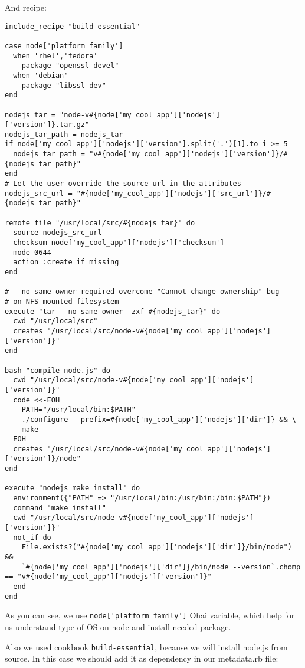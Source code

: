 And recipe:

\begin{lstlisting}[label=lst:cookbook-ohai-recipe-before,title=my-server-cloud/site-cookbooks/my\_cool\_app/recipes/node.rb]
include_recipe "build-essential"

case node['platform_family']
  when 'rhel','fedora'
    package "openssl-devel"
  when 'debian'
    package "libssl-dev"
end

nodejs_tar = "node-v#{node['my_cool_app']['nodejs']['version']}.tar.gz"
nodejs_tar_path = nodejs_tar
if node['my_cool_app']['nodejs']['version'].split('.')[1].to_i >= 5
  nodejs_tar_path = "v#{node['my_cool_app']['nodejs']['version']}/#{nodejs_tar_path}"
end
# Let the user override the source url in the attributes
nodejs_src_url = "#{node['my_cool_app']['nodejs']['src_url']}/#{nodejs_tar_path}"

remote_file "/usr/local/src/#{nodejs_tar}" do
  source nodejs_src_url
  checksum node['my_cool_app']['nodejs']['checksum']
  mode 0644
  action :create_if_missing
end

# --no-same-owner required overcome "Cannot change ownership" bug
# on NFS-mounted filesystem
execute "tar --no-same-owner -zxf #{nodejs_tar}" do
  cwd "/usr/local/src"
  creates "/usr/local/src/node-v#{node['my_cool_app']['nodejs']['version']}"
end

bash "compile node.js" do
  cwd "/usr/local/src/node-v#{node['my_cool_app']['nodejs']['version']}"
  code <<-EOH
    PATH="/usr/local/bin:$PATH"
    ./configure --prefix=#{node['my_cool_app']['nodejs']['dir']} && \
    make
  EOH
  creates "/usr/local/src/node-v#{node['my_cool_app']['nodejs']['version']}/node"
end

execute "nodejs make install" do
  environment({"PATH" => "/usr/local/bin:/usr/bin:/bin:$PATH"})
  command "make install"
  cwd "/usr/local/src/node-v#{node['my_cool_app']['nodejs']['version']}"
  not_if do
    File.exists?("#{node['my_cool_app']['nodejs']['dir']}/bin/node") &&
    `#{node['my_cool_app']['nodejs']['dir']}/bin/node --version`.chomp == "v#{node['my_cool_app']['nodejs']['version']}"
  end
end
\end{lstlisting}

As you can see, we use \lstinline!node['platform_family']! Ohai variable, which help for us understand type of OS on node and install needed package.

Also we used cookbook \lstinline!build-essential!, because we will install node.js from source. In this case we should add it as dependency in our metadata.rb file:

